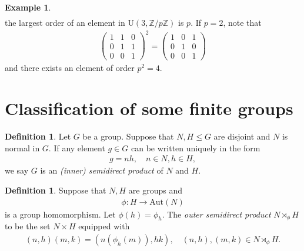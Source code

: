 \documentclass[12pt]{report}
\theoremstyle{plain}
\theoremstyle{remark}
\theoremstyle{definition}
\newtheorem{definition}[theorem]{Definition}
\newtheorem{example}[theorem]{Example}
\newcommand{\Z}{\mathbb{Z}}
\begin{document}
\begin{example}
\begin{align*}
    \end{align*}
    the largest order of an element in $\mathrm{U}(3,\Z/p\Z)$ is $p$. If $p=2$, note that
    \begin{align*}
        \begin{pmatrix}
            1 & 1 & 0 \\ 0 & 1 & 1 \\ 0 & 0 & 1
        \end{pmatrix}^2 = \begin{pmatrix}
            1 & 0 & 1 \\ 0 & 1 & 0 \\ 0 & 0 & 1
        \end{pmatrix}
    \end{align*}
    and there exists an element of order $p^2 = 4$.
\end{example}


\section{Classification of some finite groups}
\begin{definition}
    Let $G$ be a group. Suppose that $N,H\le G$ are disjoint and $N$ is normal in $G$. If any element $g\in G$ can be written uniquely in the form
    \begin{align*}
        g=nh,\quad n\in N,h\in H,
    \end{align*}
    we say $G$ is an \emph{(inner) semidirect product} of $N$ and $H$. 
\end{definition}

\begin{definition}
    Suppose that $N,H$ are groups and
    \begin{align*}
        \phi:H\rightarrow\mathrm{Aut}(N)
    \end{align*}
    is a group homomorphism. Let $\phi(h)=\phi_h$. The \emph{outer semidirect product} $N\rtimes_\phi H$ to be the set $N\times H$ equipped with
    \begin{align*}
        (n,h)(m,k) = (n(\phi_h(m)),hk),\quad (n,h),(m,k)\in N\rtimes_\phi H.
    \end{align*}
\end{definition}
\end{document}
